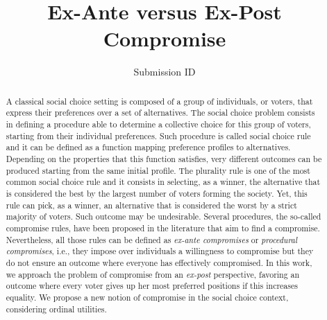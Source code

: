 \documentclass[version=3.21, pagesize, twoside=off, bibliography=totoc, DIV=calc, fontsize=12pt, a4paper]{scrartcl}
\title{Ex-Ante versus Ex-Post Compromise}
\author{Submission ID}
\begin{document}
\maketitle

\begin{abstract}
	A classical social choice setting is composed of a group of individuals, or voters, that express their preferences over a set of alternatives. The social choice problem consists in defining a procedure able to determine a collective choice for this group of voters, starting from their individual preferences. Such procedure is called social choice rule and it can be defined as a function mapping preference profiles to alternatives. Depending on the properties that this function satisfies, very different outcomes can be produced starting from the same initial profile. The plurality rule is one of the most common social choice rule and it consists in selecting, as a winner, the alternative that is considered the best by the largest number of voters forming the society. Yet, this rule can pick, as a winner, an alternative that is considered the worst by a strict majority of voters. Such outcome may be undesirable. Several procedures, the so-called compromise rules, have been proposed in the literature that aim to find a compromise. Nevertheless, all those rules can be defined as \emph{ex-ante compromises} or \emph{procedural compromises}, i.e., they impose over individuals a willingness to compromise but they do not ensure an outcome where everyone has effectively compromised. In this work, we approach the problem of compromise from an \emph{ex-post} perspective, favoring an outcome where every voter gives up her most preferred positions if this increases equality. We propose a new notion of compromise in the social choice context, considering ordinal utilities.
\end{abstract}
\end{document}
